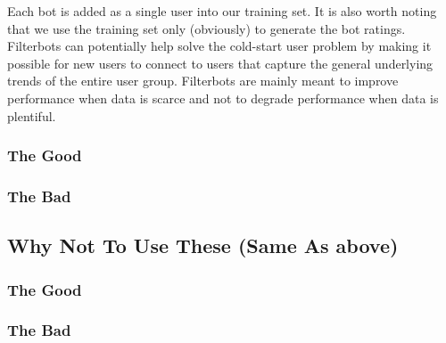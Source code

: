 Each bot is added as a single user into our training set. It is also worth noting that we use the training set only (obviously) to generate the bot ratings. Filterbots can potentially help solve the cold-start user problem by making it possible for new users to connect to users that capture the general underlying trends of the entire user group. Filterbots are mainly meant to improve performance when data is scarce and not to degrade performance when data is plentiful.





\subsubsection{The Good}
\subsubsection{The Bad}
\subsection{Why Not To Use These (Same As above)}
\subsubsection{The Good}
\subsubsection{The Bad}
